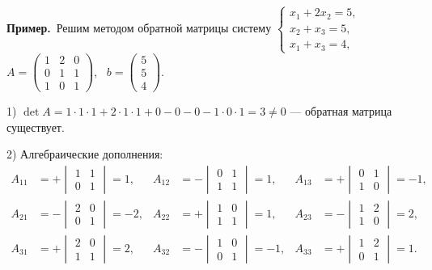 \documentclass[a4paper,11pt]{article}
\newcommand{\prim}{\par\smallskip\noindent\textbf{\textcolor{teoc!80!black}{Пример.}}\ }
\begin{document}
\prim Решим методом обратной матрицы систему
$\begin{cases} x_1 + 2x_2 = 5, \\ x_2 + x_3 = 5, \\ x_1 + x_3 = 4, \end{cases}$ \quad
$A = \begin{pmatrix} 1 & 2 & 0 \\ 0 & 1 & 1 \\ 1 & 0 & 1 \end{pmatrix}$, \ $b = \begin{pmatrix} 5 \\ 5 \\ 4 \end{pmatrix}$.

1) $\det A = 1\cdot1\cdot1 + 2\cdot1\cdot1 + 0 - 0 - 0 - 1\cdot0\cdot1 = 3 \ne 0$ --- обратная матрица существует.

2) Алгебраические дополнения:
\[
\begin{aligned}
  A_{11} &= +\begin{vmatrix} 1 & 1 \\ 0 & 1 \end{vmatrix} = 1, &
  A_{12} &= -\begin{vmatrix} 0 & 1 \\ 1 & 1 \end{vmatrix} = 1, &
  A_{13} &= +\begin{vmatrix} 0 & 1 \\ 1 & 0 \end{vmatrix} = -1, \\
  A_{21} &= -\begin{vmatrix} 2 & 0 \\ 0 & 1 \end{vmatrix} = -2, &
  A_{22} &= +\begin{vmatrix} 1 & 0 \\ 1 & 1 \end{vmatrix} = 1, &
  A_{23} &= -\begin{vmatrix} 1 & 2 \\ 1 & 0 \end{vmatrix} = 2, \\
  A_{31} &= +\begin{vmatrix} 2 & 0 \\ 1 & 1 \end{vmatrix} = 2, &
  A_{32} &= -\begin{vmatrix} 1 & 0 \\ 0 & 1 \end{vmatrix} = -1, &
  A_{33} &= +\begin{vmatrix} 1 & 2 \\ 0 & 1 \end{vmatrix} = 1.
\end{aligned}
\]
\end{document}
